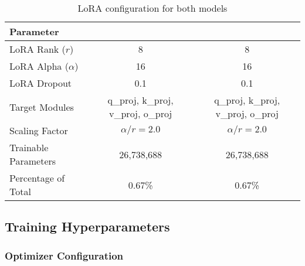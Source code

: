 \begin{table}[H]
\centering
\begin{tabular}{lcc}
\toprule
\textbf{Parameter} & \textbf{\supra{}} & \textbf{\zennano{}} \\
\midrule
LoRA Rank ($r$) & 8 & 8 \\
LoRA Alpha ($\alpha$) & 16 & 16 \\
LoRA Dropout & 0.1 & 0.1 \\
Target Modules & q\_proj, k\_proj, v\_proj, o\_proj & q\_proj, k\_proj, v\_proj, o\_proj \\
Scaling Factor & $\alpha/r = 2.0$ & $\alpha/r = 2.0$ \\
Trainable Parameters & 26,738,688 & 26,738,688 \\
Percentage of Total & 0.67\% & 0.67\% \\
\bottomrule
\end{tabular}
\caption{LoRA configuration for both models}
\label{tab:lora-config}
\end{table}

\subsection{Training Hyperparameters}

\subsubsection{Optimizer Configuration}


